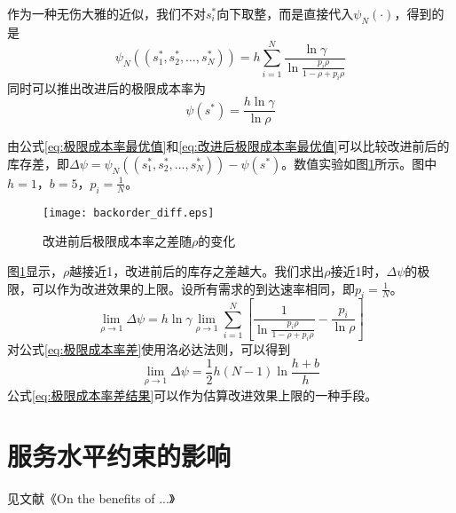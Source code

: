 作为一种无伤大雅的近似，我们不对$s_i^*$向下取整，而是直接代入$\psi_N(\cdot)$，得到的是
\begin{equation}
\psi_N((s_1^*,s_2^*,\ldots,s_N^*)) = h\sum_{i=1}^N\frac{\ln\gamma}{\ln\frac{p_i\rho}{1-\rho+p_i\rho}}
\label{eq:极限成本率最优值}
\end{equation}
同时可以推出改进后的极限成本率为
\begin{equation}
\psi(s^*) = \frac{h\ln\gamma}{\ln\rho}
\label{eq:改进后极限成本率最优值}
\end{equation}

由公式\ref{eq:极限成本率最优值}和\ref{eq:改进后极限成本率最优值}可以比较改进前后的库存差，即$\Delta\psi=\psi_N((s_1^*,s_2^*,\ldots,s_N^*))-\psi(s^*)$。数值实验如图\ref{fig:改进前后极限成本率之差}所示。图中$h=1$，$b=5$，$p_i=\frac{1}{N}$。

\begin{figure}[htbp]
\centering
\texttt{[image: backorder\_diff.eps]}
\caption{改进前后极限成本率之差随$\rho$的变化}
\label{fig:改进前后极限成本率之差}
\end{figure}

图\ref{fig:改进前后极限成本率之差}显示，$\rho$越接近1，改进前后的库存之差越大。我们求出$\rho$接近1时，$\Delta\psi$的极限，可以作为改进效果的上限。设所有需求的到达速率相同，即$p_i=\frac{1}{N}$。
\begin{equation}
\lim_{\rho\to 1}\Delta\psi = h\ln\gamma\lim_{\rho\to 1}\sum_{i=1}^N\left[\frac{1}{\ln\frac{p_i\rho}{1-\rho+p_i\rho}}-\frac{p_i}{\ln\rho}\right]
\label{eq:极限成本率差}
\end{equation}
对公式\ref{eq:极限成本率差}使用洛必达法则，可以得到
\begin{equation}
\lim_{\rho\to 1}\Delta\psi = \frac{1}{2}h(N-1)\ln\frac{h+b}{h}
\label{eq:极限成本率差结果}
\end{equation}
公式\ref{eq:极限成本率差结果}可以作为估算改进效果上限的一种手段。







\section{服务水平约束的影响}

见文献《On the benefits of ...》






